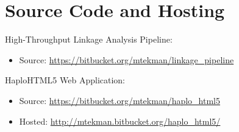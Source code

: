 \pagebreak
\listoffigures
\begingroup
\let\clearpage\relax
\vspace{50pt}
\listoftables
\vspace{50pt}
\lstlistoflistings

\vfill
\chapter*{Source Code and Hosting}


\begin{description}
\renewcommand\labelitemi{\textendash}
\item{{High-Throughput Linkage Analysis Pipeline:}
	\begin{itemize}
		\item{{{Source:}} \url{https://bitbucket.org/mtekman/linkage_pipeline}}
	\end{itemize}
}
\item{{HaploHTML5 Web Application:} 
	\begin{itemize}
		\item{{{Source:}} \url{https://bitbucket.org/mtekman/haplo_html5}}
		\item{{{Hosted:}} \url{http://mtekman.bitbucket.org/haplo_html5/}}
	\end{itemize}
}
\end{description}
